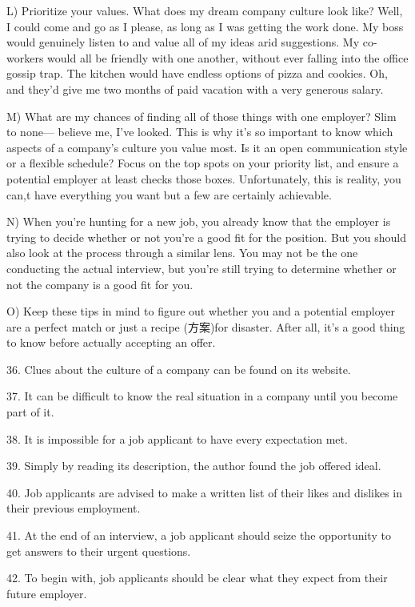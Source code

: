 \documentclass[UTF8,11pt]{ctexart}
\begin{document}
L) Prioritize your values. What does my dream company culture look like? Well, I could come and go as I please, as long as I was getting the work done. My boss would genuinely listen to and value all of my ideas arid suggestions. My co-workers would all be friendly with one another, without ever falling into the office gossip trap. The kitchen would have endless options of pizza and cookies. Oh, and they'd give me two months of paid vacation with a very generous salary.


M) What are my chances of finding all of those things with one employer? Slim to none— believe me, I've looked. This is why it's so important to know which aspects of a company's culture you value most. Is it an open communication style or a flexible schedule? Focus on the top spots on your priority list, and ensure a potential employer at least checks those boxes. Unfortunately, this is reality, you can,t have everything you want but a few are certainly achievable.


N) When you're hunting for a new job, you already know that the employer is trying to decide whether or not you're a good fit for the position. But you should also look at the process through a similar lens. You may not be the one conducting the actual interview, but you're still trying to determine whether or not the company is a good fit for you.


O) Keep these tips in mind to figure out whether you and a potential employer are a perfect match or just a recipe (方案)for disaster. After all, it's a good thing to know before actually accepting an offer.


36. Clues about the culture of a company can be found on its website.


37. It can be difficult to know the real situation in a company until you become part of it.


38. It is impossible for a job applicant to have every expectation met.


39. Simply by reading its description, the author found the job offered ideal.


40. Job applicants are advised to make a written list of their likes and dislikes in their previous employment.


41. At the end of an interview, a job applicant should seize the opportunity to get answers to their urgent questions.


42. To begin with, job applicants should be clear what they expect from their future employer.
\end{document}
